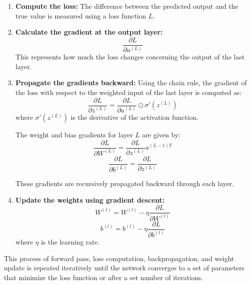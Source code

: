 \begin{enumerate}
    \item \textbf{Compute the loss:}
    The difference between the predicted output and the true value is measured using a loss function \( L \).  
    \item \textbf{Calculate the gradient at the output layer:}  
    \begin{equation}
        \frac{\partial L}{\partial a^{(L)}}
    \end{equation}
    This represents how much the loss changes concerning the output of the last layer.
    \item \textbf{Propagate the gradients backward:}  
    Using the chain rule, the gradient of the loss with respect to the weighted input of the last layer is computed as:
    \begin{equation}
        \frac{\partial L}{\partial z^{(L)}} = \frac{\partial L}{\partial a^{(L)}} \odot \sigma'(z^{(L)})
    \end{equation}
    where \( \sigma'(z^{(L)}) \) is the derivative of the activation function.  

    The weight and bias gradients for layer \( L \) are given by:
    \begin{equation}
        \frac{\partial L}{\partial W^{(L)}} = \frac{\partial L}{\partial z^{(L)}} a^{(L-1)T}
    \end{equation}
    \begin{equation}
        \frac{\partial L}{\partial b^{(L)}} = \frac{\partial L}{\partial z^{(L)}}
    \end{equation}

    These gradients are recursively propagated backward through each layer.
    \item \textbf{Update the weights using gradient descent:}  
    \begin{equation}
        W^{(l)} = W^{(l)} - \eta \frac{\partial L}{\partial W^{(l)}}
    \end{equation}
    \begin{equation}
        b^{(l)} = b^{(l)} - \eta \frac{\partial L}{\partial b^{(l)}}
    \end{equation}
    where \( \eta \) is the learning rate.
\end{enumerate}

This process of forward pass, loss computation, backpropagation, and weight update is repeated iteratively until the network converges to a set of parameters that minimize the loss function or after a set number of iterations.

